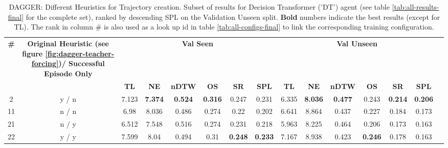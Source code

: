 \begin{table}
\centering
\caption{\label{tab:dt_dagger_pe_oa}DAGGER: Different Heuristics for Trajectory creation. Subset of results for Decision Transformer ('DT') agent (see table \ref{tab:all-results-final} for the complete set), ranked by descending SPL on the Validation Unseen split. \textbf{Bold} numbers indicate the best results (except for TL). The rank in column \# is also used as a look up id in table \ref{tab:all-configs-final} to link the corresponding training configuration.}
\begin{tabular}{@{\hskip3pt}c@{\hskip3pt}c@{\hskip3pt}c@{\hskip3pt}c@{\hskip3pt}c@{\hskip3pt}c@{\hskip3pt}c@{\hskip3pt}c@{\hskip3pt}c@{\hskip3pt}c@{\hskip3pt}c@{\hskip3pt}c@{\hskip3pt}c@{\hskip3pt}c@{\hskip3pt}c}
\toprule
                                  \textbf{\#} & \textbf{ Original Heuristic (see figure \ref{fig:dagger-teacher-forcing})/ Successful Episode Only} & \multicolumn{6}{c}{\textbf{Val Seen}} & \multicolumn{6}{c}{\textbf{Val Unseen}} \\
\cmidrule(l){3-8}\cmidrule(l){9-14}\textbf{~} &                                                                                          \textbf{~} &       \textbf{TL} &     \textbf{NE} &   \textbf{nDTW} &     \textbf{OS} &     \textbf{SR} &    \textbf{SPL} &         \textbf{TL} &     \textbf{NE} &   \textbf{nDTW} &     \textbf{OS} &     \textbf{SR} &    \textbf{SPL} \\
\midrule
                                            2 &                                              y / n &             7.123 &  \textbf{7.374} &  \textbf{0.524} &  \textbf{0.316} &           0.247 &           0.231 &               6.335 &  \textbf{8.036} &  \textbf{0.477} &           0.243 &  \textbf{0.214} &  \textbf{0.206} \\
                                           11 &                                              n / n &              6.98 &           8.036 &           0.486 &           0.274 &            0.22 &           0.202 &               6.641 &           8.864 &           0.437 &           0.227 &           0.184 &           0.173 \\
                                           21 &                                              n / y &             6.512 &           7.548 &           0.516 &           0.274 &           0.231 &           0.218 &               5.963 &           8.225 &           0.464 &           0.206 &           0.173 &           0.163 \\
                                           22 &                                              y / y &             7.599 &            8.04 &           0.494 &            0.31 &  \textbf{0.248} &  \textbf{0.233} &               7.167 &           8.938 &           0.423 &  \textbf{0.246} &           0.178 &           0.163 \\
\bottomrule
\end{tabular}
\end{table}
